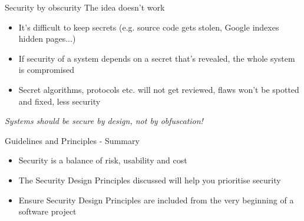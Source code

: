 \documentclass[aspectratio=169]{beamer}
\begin{document}
\begin{frame}{Security by obscurity}
The idea doesn’t work
\begin{itemize}
\item It’s difficult to keep secrets (e.g. source code gets stolen, Google indexes hidden pages...)
\item If security of a system depends on a secret that's revealed, the whole system is compromised
\item Secret algorithms, protocols etc. will not get reviewed, flaws won’t be spotted and fixed, less security
\end{itemize}
\centering
{ \color{red} \textit{Systems should be secure by design, not by obfuscation!} }
\end{frame}

\begin{frame}{Guidelines and Principles - Summary}
\begin{itemize}
\item Security is a balance of risk, usability and cost
\item The Security Design Principles discussed will help you prioritise security
\item Ensure Security Design Principles are included from the very beginning of a software project
\end{itemize}
\end{frame}
\end{document}
